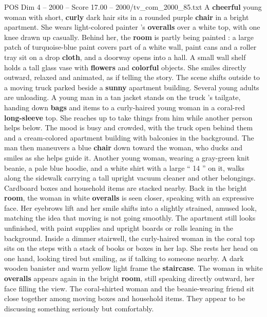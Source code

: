 \begin{textsample}{POS Dim 4 – 2000 – Score 17.00 – 2000/tv\_com\_2000\_85.txt}  \label{ex:f4_pos_053}
A \textbf{cheerful} young woman with short, \textbf{curly} dark hair sits in a rounded purple \textbf{chair} in a bright apartment.
She wears light-colored painter ’s \textbf{overalls} over a white top, with one knee drawn up casually.
Behind her, the \textbf{room} is partly being painted : a large patch of turquoise-blue paint covers part of a white wall, paint cans and a roller tray sit on a drop \textbf{cloth}, and a doorway opens into a hall.
A small wall shelf holds a tall glass vase with \textbf{flowers} and \textbf{colorful} objects.
She smiles directly outward, relaxed and animated, as if telling the story.
The scene shifts outside to a moving truck parked beside a \textbf{sunny} apartment building.
Several young adults are unloading.
A young man in a tan jacket stands on the truck ’s tailgate, handing down \textbf{bags} and items to a curly-haired young woman in a coral-red \textbf{long-sleeve} top.
She reaches up to take things from him while another person helps below.
The mood is busy and crowded, with the truck open behind them and a cream-colored apartment building with balconies in the background.
The man then maneuvers a blue \textbf{chair} down toward the woman, who ducks and smiles as she helps guide it.
Another young woman, wearing a gray-green knit beanie, a pale blue hoodie, and a white shirt with a large “ 14 ” on it, walks along the sidewalk carrying a tall upright vacuum cleaner and other belongings.
Cardboard boxes and household items are stacked nearby.
Back in the bright \textbf{room}, the woman in white \textbf{overalls} is seen closer, speaking with an expressive face.
Her eyebrows lift and her smile shifts into a slightly strained, amused look, matching the idea that moving is not going smoothly.
The apartment still looks unfinished, with paint supplies and upright boards or rolls leaning in the background.
Inside a dimmer stairwell, the curly-haired woman in the coral top sits on the steps with a stack of books or boxes in her lap.
She rests her head on one hand, looking tired but smiling, as if talking to someone nearby.
A dark wooden banister and warm yellow light frame the \textbf{staircase}.
The woman in white \textbf{overalls} appears again in the bright \textbf{room}, still speaking directly outward, her face filling the view.
The coral-shirted woman and the beanie-wearing friend sit close together among moving boxes and household items.
They appear to be discussing something seriously but comfortably.

\end{textsample}
